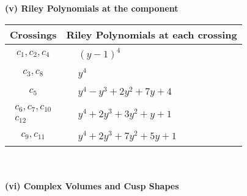 \documentclass[1p]{elsarticle_modified}
\theoremstyle{definition}
\begin{document}
\newpage\renewcommand{\arraystretch}{1}
\flushleft \textbf{(v) Riley Polynomials at the component}\newline \\
\begin{tabular}{m{50pt}|m{274pt}}
Crossings & \hspace{64pt}Riley Polynomials at each crossing \\
\hline $$\begin{aligned}c_{1},c_{2},c_{4}\end{aligned}$$&$\begin{aligned}
&(y-1)^4
\end{aligned}$\\
\hline $$\begin{aligned}c_{3},c_{8}\end{aligned}$$&$\begin{aligned}
&y^4
\end{aligned}$\\
\hline $$\begin{aligned}c_{5}\end{aligned}$$&$\begin{aligned}
&y^4- y^3+2 y^2+7 y+4
\end{aligned}$\\
\hline $$\begin{aligned}c_{6},c_{7},c_{10}\\c_{12}\end{aligned}$$&$\begin{aligned}
&y^4+2 y^3+3 y^2+y+1
\end{aligned}$\\
\hline $$\begin{aligned}c_{9},c_{11}\end{aligned}$$&$\begin{aligned}
&y^4+2 y^3+7 y^2+5 y+1
\end{aligned}$\\
\hline
\end{tabular}\\~\\
\newpage\flushleft \textbf{(vi) Complex Volumes and Cusp Shapes}
\end{document}

